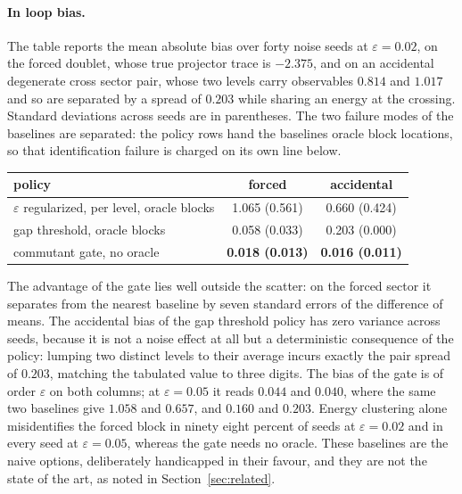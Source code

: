 \documentclass[11pt]{article}
\begin{document}
\paragraph{In loop bias.}\label{sec:bias}
The table reports the mean absolute bias over forty noise seeds at
$\varepsilon=0.02$, on the forced doublet, whose true projector trace is
$-2.375$, and on an accidental degenerate cross sector pair, whose two levels
carry observables $0.814$ and $1.017$ and so are separated by a spread of $0.203$
while sharing an energy at the crossing. Standard deviations across seeds are in
parentheses. The two failure modes of the baselines are separated: the policy
rows hand the baselines oracle block locations, so that identification failure is
charged on its own line below.
\begin{center}
\begin{tabular}{lcc}
\toprule
policy & forced & accidental\\
\midrule
$\varepsilon$ regularized, per level, oracle blocks & 1.065 (0.561) & 0.660 (0.424)\\
gap threshold, oracle blocks & 0.058 (0.033) & 0.203 (0.000)\\
commutant gate, no oracle & \textbf{0.018 (0.013)} & \textbf{0.016 (0.011)}\\
\bottomrule
\end{tabular}
\end{center}
The advantage of the gate lies well outside the scatter: on the forced sector it
separates from the nearest baseline by seven standard errors of the difference of
means. The accidental bias of the gap threshold policy has zero variance across
seeds, because it is not a noise effect at all but a deterministic consequence of
the policy: lumping two distinct levels to their average incurs exactly the pair
spread of $0.203$, matching the tabulated value to three digits. The bias of the
gate is of order $\varepsilon$ on both columns; at $\varepsilon=0.05$ it reads
$0.044$ and $0.040$, where the same two baselines give $1.058$ and $0.657$, and
$0.160$ and $0.203$. Energy clustering alone misidentifies the forced block in
ninety eight percent of seeds at $\varepsilon=0.02$ and in every seed at
$\varepsilon=0.05$, whereas the gate needs no oracle. These baselines are the
naive options, deliberately handicapped in their favour, and they are not the
state of the art, as noted in Section~\ref{sec:related}.
\end{document}
